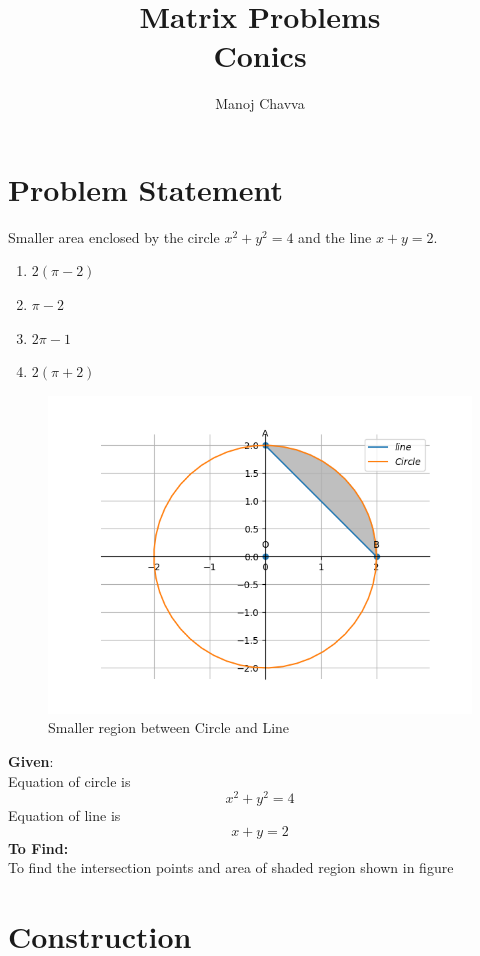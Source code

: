 \documentclass[journal,12pt,twocolumn]{IEEEtran}
\title{Matrix Problems \textbf{\\Conics }}
\author{Manoj Chavva}
\begin{document}
\maketitle
\section{Problem Statement}

\noindent Smaller area enclosed by the circle $x^2 + y^2 = 4$ and the line $x + y = 2$. 
\begin{enumerate}
\item $2(\pi -2)$
\item $\pi -2$
\item $2\pi -1$
\item $2(\pi +2)$
\end{enumerate}


\begin{figure}[h]
\includegraphics[width=1\columnwidth]{./figs/conic.png}
\caption{Smaller region between Circle and Line}
\label{fig:conic}
\end{figure}

\raggedright \textbf{Given}: \\
Equation of circle is  
\begin{equation} x^2 + y^2 = 4
\end{equation}
Equation of line is 
\begin{equation}
x+y=2
\end{equation}
\textbf{To Find:} \\
To find the intersection points and area of shaded region shown in figure\
\section{Construction}
\end{document}
